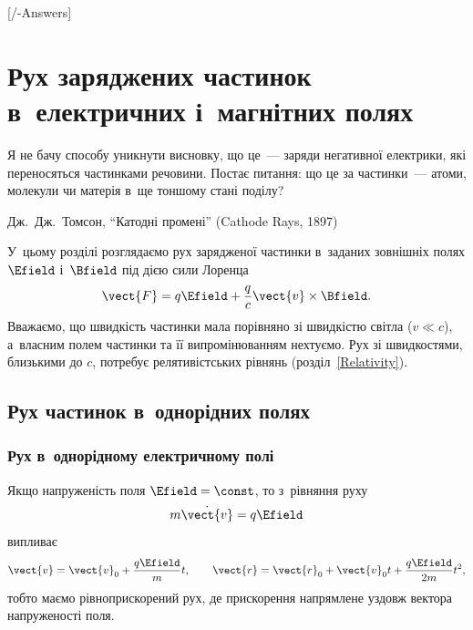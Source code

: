 

[\currfilebase/\currfilebase-Answers]
\chapter[Рух заряджених частинок]{Рух заряджених частинок в~електричних і~магнітних полях}\label{\currfilebase}\hypertarget{EBMotion}{}
\graphicspath{{\currfilebase/Pictures}}
\epigraph{\Alexander Я не бачу способу уникнути висновку, що це~--- заряди негативної електрики, які переносяться частинками речовини. Постає
	питання: що це за частинки~--- атоми, молекули чи матерія в~ще тоншому стані поділу?
}{Дж.~Дж.~Томсон, \enquote{Катодні промені} (Cathode Rays, 1897)}

У~цьому розділі розглядаємо рух зарядженої частинки в~заданих зовнішніх полях $\Efield$ і~$\Bfield$ під дією сили Лоренца
\[
	\vect{F} = q\Efield + \frac{q}{c}\vect{v}\times\Bfield.
\]
Вважаємо, що швидкість частинки мала порівняно зі швидкістю світла ($v\ll c$), а~власним полем частинки та її випромінюванням нехтуємо.
Рух зі швидкостями, близькими до $c$, потребує релятивістських рівнянь (розділ~\ref{Relativity}).


\section{Рух частинок в~однорідних полях}\hypertarget{motion-in-uniform-fields}{}


\subsection*{Рух в~однорідному електричному полі}


Якщо напруженість поля $\Efield = \const$, то з~рівняння руху
\begin{equation}\label{eq:motion_E}
	m\dot{\vect{v}} = q\Efield
\end{equation}
випливає
\begin{equation}\label{eq:motion_E_solution}
	\vect{v} = \vect{v}_0 + \frac{q\Efield}{m}t, \qquad
	\vect{r} = \vect{r}_0 + \vect{v}_0 t + \frac{q\Efield}{2m}t^2,
\end{equation}
тобто маємо рівноприскорений рух, де прискорення напрямлене уздовж вектора напруженості поля.


